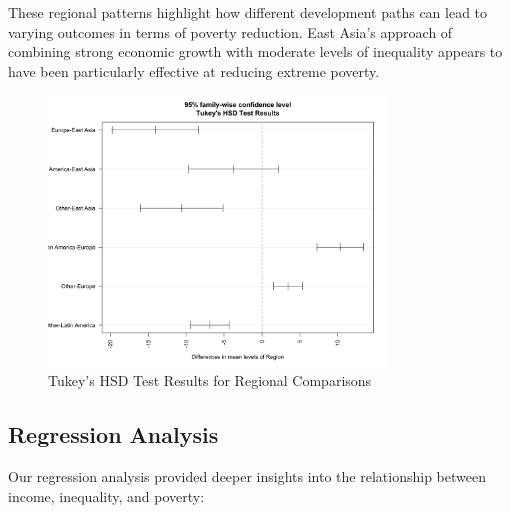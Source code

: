 \documentclass[12pt,a4paper]{article}
\begin{document}
These regional patterns highlight how different development paths can lead to varying outcomes in terms of poverty reduction. East Asia's approach of combining strong economic growth with moderate levels of inequality appears to have been particularly effective at reducing extreme poverty.

\begin{figure}[h]
\centering
\includegraphics[width=0.8\textwidth]{../output/visualizations/tukey_hsd_results.png}
\caption{Tukey's HSD Test Results for Regional Comparisons}
\end{figure}

\subsection{Regression Analysis}
Our regression analysis provided deeper insights into the relationship between income, inequality, and poverty:
\end{document}
